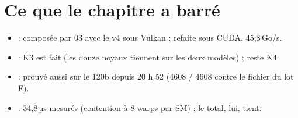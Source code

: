 \section{Ce que le chapitre a barré}\label{sec:t2n-barres}

\begin{itemize}
\item {} : composée par 03 avec le v4 sous Vulkan ; refaite sous CUDA, 45,8\,Go/s.
\item {} : K3 est fait (les douze noyaux tiennent sur les deux modèles) ; reste K4.
\item {} : prouvé aussi sur le 120b depuis 20 h 52 (\num{4608} / \num{4608} contre le fichier du lot F).
\item {} : 34,8\,µs mesurés (contention à 8 warps par SM) ; le total, lui, tient.
\end{itemize}

